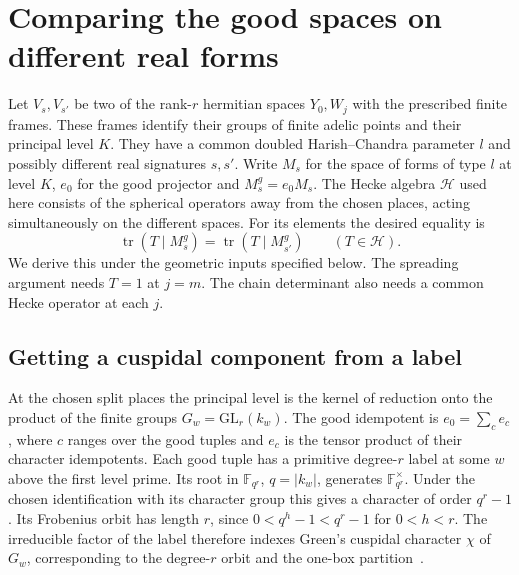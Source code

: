 \section{Comparing the good spaces on different real forms}
\label{sec:trace}

Let $V_s,V_{s'}$ be two of the rank-$r$ hermitian spaces $Y_0,W_j$
with the prescribed finite frames. These frames identify their groups of
finite adelic points and their principal level $K$. They have a common
doubled Harish--Chandra parameter $l$ and possibly different real
signatures $s,s'$. Write $M_s$ for the space of forms of type $l$ at
level $K$, $e_0$ for the good projector and $M_s^g=e_0M_s$. The Hecke
algebra $\mathcal H$ used here consists of the spherical operators away
from the chosen places, acting simultaneously on the different spaces.
For its elements the desired equality is
\begin{equation}\label{tr:good}
  \operatorname{tr}(T\mid M_s^g)=\operatorname{tr}(T\mid M_{s'}^g)
  \qquad(T\in\mathcal H).
\end{equation}
We derive this under the geometric inputs specified below. The spreading
argument needs $T=1$ at $j=m$. The chain determinant also needs a common
Hecke operator at each $j$.

\subsection{Getting a cuspidal component from a label}\label{tr:label}
At the chosen split places the principal level is the kernel of reduction
onto the product of the finite groups $G_w=\mathrm{GL}_r(k_w)$.
The good idempotent is $e_0=\sum_c e_c$, where $c$ ranges over the good
tuples and $e_c$ is the tensor product of their character idempotents.
Each good tuple has a primitive degree-$r$ label at some $w$ above
the first level prime. Its root in $\mathbb F_{q^r}$,
$q=|k_w|$, generates $\mathbb F_{q^r}^{\times}$. Under the chosen
identification with its character group this gives a character of order
$q^r-1$. Its Frobenius orbit has length $r$, since $0<q^h-1<q^r-1$
for $0<h<r$. The irreducible factor of the label therefore indexes
Green's cuspidal character $\chi$ of $G_w$, corresponding to the degree-$r$
orbit and the one-box partition~\cite[\S8, Theorem~14]{green}.


